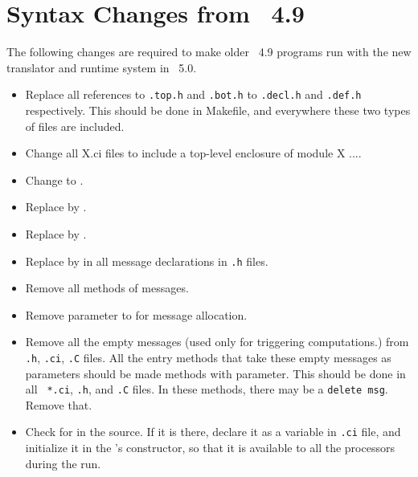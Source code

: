 \section{Syntax Changes from \charmpp\ 4.9}

The following changes are required to make older \charmpp\ 4.9
programs run with the new translator and runtime system in
\charmpp\ 5.0.

\begin{itemize}

\item Replace all references to {\tt *.top.h} and {\tt *.bot.h} to
{\tt *.decl.h} and {\tt *.def.h} respectively. This should be done in
Makefile, and everywhere these two types of files are included.

\item Change all X.ci files to include a top-level enclosure of module X {...}.

\item Change   to  .

\item Replace  by .

\item Replace  by .

\item Replace  by  in all
message declarations in {\tt *.h} files. 

\item Remove all  methods of messages.

\item Remove  parameter to  for message allocation.

\item Remove all the empty messages (used only for triggering
computations.) from {\tt *.h}, {\tt *.ci}, {\tt *.C} files. All the
entry methods that take these empty messages as parameters should be
made methods with  parameter. This should be done in all {\tt
*.ci}, {\tt *.h}, and {\tt *.C} files.  In these methods, there may be
a {\tt delete msg}. Remove that. 

\item Check for  in the source. If it is there, declare
it as a  variable in {\tt .ci} file, and initialize it in
the 's constructor, so that it is available to all the
processors during the run.


\end{itemize}
